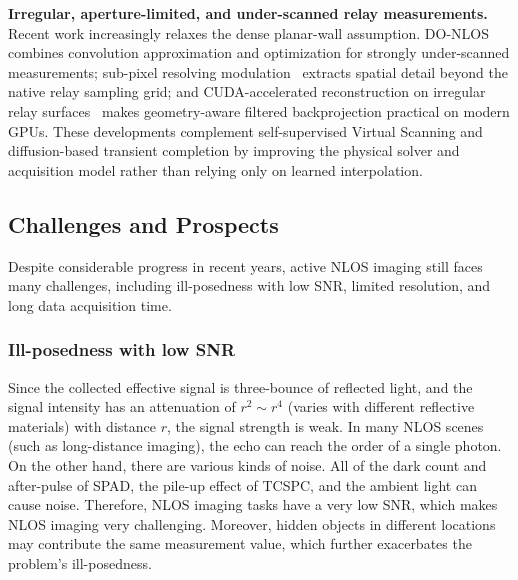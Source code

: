 \vspace{0.8mm}
\noindent \textbf{Irregular, aperture-limited, and under-scanned relay measurements.}
Recent work increasingly relaxes the dense planar-wall assumption. DO-NLOS~\cite{miaoUnderScanning2025} combines convolution approximation and optimization for strongly under-scanned measurements; sub-pixel resolving modulation~\cite{zhangSubpixelModulation2025} extracts spatial detail beyond the native relay sampling grid; and CUDA-accelerated reconstruction on irregular relay surfaces~\cite{sunCUDAIrregular2026} makes geometry-aware filtered backprojection practical on modern GPUs. These developments complement self-supervised Virtual Scanning and diffusion-based transient completion by improving the physical solver and acquisition model rather than relying only on learned interpolation.

\subsection{Challenges and Prospects} \label{sec:activeChallenge}
Despite considerable progress in recent years, active NLOS imaging still faces many challenges, including ill-posedness with low SNR, limited resolution, and long data acquisition time. 

\subsubsection{Ill-posedness with low SNR}
Since the collected effective signal is three-bounce of reflected light, and the signal intensity has an attenuation of $r^2\sim r^4$\cite{otooleConfocalNonlineofsightImaging2018} (varies with different reflective materials) with distance $r$, the signal strength is weak. In many NLOS scenes (such as long-distance imaging\cite{wuNonLineofsightImaging2021,liSinglephotonImaging2002021}), the echo can reach the order of a single photon. On the other hand, there are various kinds of noise. All of the dark count and after-pulse of SPAD, the pile-up effect of TCSPC, and the ambient light can cause noise. Therefore, NLOS imaging tasks have a very low SNR, which makes NLOS imaging very challenging. Moreover, hidden objects in different locations may contribute the same measurement value\cite{liuAnalysisFeatureVisibility2019}, which further exacerbates the problem's ill-posedness.

